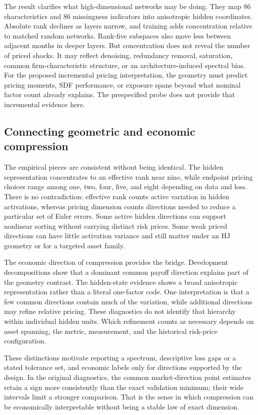 The result clarifies what high-dimensional networks may be doing. They map 86 characteristics and 86 missingness indicators into anisotropic hidden coordinates. Absolute rank declines as layers narrow, and training adds concentration relative to matched random networks. Rank-five subspaces also move less between adjacent months in deeper layers. But concentration does not reveal the number of priced shocks. It may reflect denoising, redundancy removal, saturation, common firm-characteristic structure, or an architecture-induced spectral bias. For the proposed incremental pricing interpretation, the geometry must predict pricing moments, SDF performance, or exposure spans beyond what nominal factor count already explains. The prespecified probe does not provide that incremental evidence here.

\subsection{Connecting geometric and economic compression}

The empirical pieces are consistent without being identical. The hidden representation concentrates to an effective rank near nine, while endpoint pricing choices range among one, two, four, five, and eight depending on data and loss. There is no contradiction: effective rank counts active variation in hidden activations, whereas pricing dimension counts directions needed to reduce a particular set of Euler errors. Some active hidden directions can support nonlinear sorting without carrying distinct risk prices. Some weak priced directions can have little activation variance and still matter under an HJ geometry or for a targeted asset family.

The economic direction of compression provides the bridge. Development decompositions show that a dominant common payoff direction explains part of the geometry contrast. The hidden-state evidence shows a broad anisotropic representation rather than a literal one-factor code. One interpretation is that a few common directions contain much of the variation, while additional directions may refine relative pricing. These diagnostics do not identify that hierarchy within individual hidden units. Which refinement counts as necessary depends on asset spanning, the metric, measurement, and the historical risk-price configuration.

These distinctions motivate reporting a spectrum, descriptive loss gaps or a stated tolerance set, and economic labels only for directions supported by the design. In the original diagnostics, the common market-direction point estimates retain a sign more consistently than the exact validation minimum; their wide intervals limit a stronger comparison. That is the sense in which compression can be economically interpretable without being a stable law of exact dimension.

